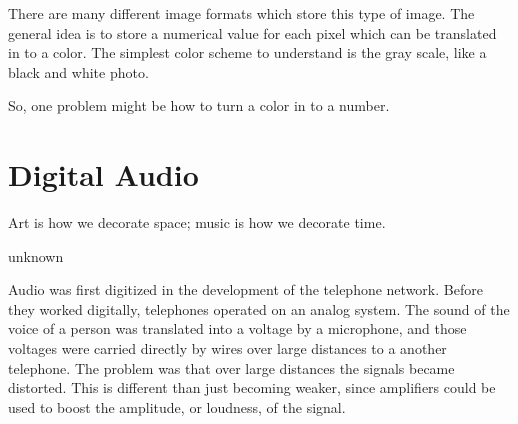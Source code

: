 There are many different image formats which store this type of image. The general idea is to store a numerical value for each pixel which can be translated in to a color. The simplest color scheme to understand is the gray scale, like a black and white photo.\\

\begin{center}\end{center}

\begin{center}\end{center}

So, one problem might be how to turn a color in to a number.\\

\begin{center}\end{center}


\begin{center}\end{center}



\begin{center}\end{center}
\begin{center}\end{center}
\begin{center}\end{center}
\begin{center}\end{center}
\begin{center}\end{center}
\begin{center}\end{center}

\section{Digital Audio}

\epigraph{Art is how we decorate space; music is how we decorate time.}{unknown}

Audio was first digitized in the development of the telephone network. Before they worked digitally, telephones operated on an analog system. The sound of the voice of a person was translated into a voltage by a microphone, and those voltages were carried directly by wires over large distances to a another telephone. The problem was that over large distances the signals became distorted. This is different than just becoming weaker, since amplifiers could be used to boost the amplitude, or loudness, of the signal.\\

